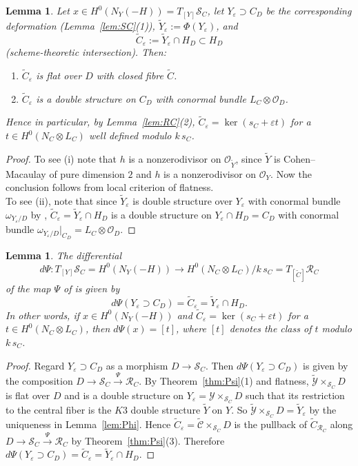 \documentclass[11pt,reqno]{amsart}
\theoremstyle{plain}
\newtheorem{lemma}[theorem]{Lemma}
\theoremstyle{definition}
\newcommand{\OO}{\mathcal{O}}
\newcommand{\Yt}{\widetilde{Y}}
\newcommand{\Ct}{\widetilde{C}}
\newcommand{\NY}{N_{Y}}
\newcommand{\SC}{\mathcal{S}_C}
\newcommand{\RC}{\mathcal{R}_C}
\newcommand{\Dd}{D}
\newcommand{\cY}{\mathcal{Y}}
\newcommand{\cYt}{\widetilde{\mathcal{Y}}}
\newcommand{\cCt}{\widetilde{\mathcal{C}}}
\begin{document}
\begin{lemma}\label{def:Psi}
Let $x\in H^0(\NY(-H))=T_{[Y]}\SC$, let $Y_\varepsilon\supset C_\Dd$ be the corresponding deformation (Lemma~\ref{lem:SC}(1)), $\Yt_\varepsilon:=\Phi(Y_\varepsilon)$, and
\[
\Ct_\varepsilon:=\Yt_\varepsilon\cap H_\Dd\subset H_\Dd
\]
(scheme-theoretic intersection). Then:
\begin{enumerate}
\item[(i)] $\Ct_\varepsilon$ is flat over $\Dd$ with closed fibre $\Ct$. 
\item[(ii)] $\Ct_\varepsilon$ is a double structure on $C_\Dd$ with conormal bundle $L_C\otimes\OO_\Dd$. 
\end{enumerate}
Hence in particular, by Lemma~\ref{lem:RC}(2), $\Ct_\varepsilon=\ker(s_C+\varepsilon t)$ for a $t\in H^0(N_C\otimes L_C)$ well defined modulo $k\,s_C$.
\end{lemma}

\begin{proof}
To see (i) note that $h$ is a nonzerodivisor on $\OO_{\Yt}$, since $\Yt$ is Cohen--Macaulay of pure dimension $2$ and $h$ is a nonzerodivisor on $\OO_{Y}$. Now the conclusion follows from local criterion of flatness. \\
To see (ii), note that since $\widetilde Y_{\varepsilon}$ is double structure over $Y_{\varepsilon}$ with conormal bundle $\omega_{Y_{\varepsilon}/D}$ by , $\widetilde C_{\varepsilon} = \widetilde Y_{\varepsilon} \cap H_D$ is a double structure on $Y_{\varepsilon} \cap H_D = C_D$ with conormal bundle $\omega_{Y_{\varepsilon}/D}|_{C_D} = L_C \otimes \mathcal O_D$. 
\end{proof}

\begin{lemma}\label{lem:dPsi}
The differential
\[
d\Psi\colon T_{[Y]}\SC=H^0(\NY(-H))\longrightarrow H^0(N_C\otimes L_C)/k\,s_C=T_{[\Ct]}\RC
\]
of the map $\Psi$ of  is given by
\[
d\Psi(Y_\varepsilon\supset C_\Dd)=\Ct_\varepsilon=\Yt_\varepsilon\cap H_\Dd .
\]
In other words, if $x\in H^0(\NY(-H))$ and $\Ct_\varepsilon=\ker(s_C+\varepsilon t)$ for a $t\in H^0(N_C\otimes L_C)$, then $d\Psi(x)=[t]$, where $[t]$ denotes the class of $t$ modulo $k\,s_C$.
\end{lemma}

\begin{proof}
 Regard $Y_\varepsilon \supset C_D$ as a morphism $\Dd\to\SC$. Then $d\Psi(Y_\varepsilon \supset C_D)$ is given by the composition $D \to \mathcal{S}_C \xrightarrow{\Psi} \mathcal{R}_C$. By Theorem~\ref{thm:Psi}(1) and flatness, $\cYt\times_{\SC}\Dd$ is flat over $\Dd$ and is a double structure on $Y_\varepsilon=\cY\times_{\SC}\Dd$ such that its restriction to the central fiber is the $K3$ double structure $\widetilde Y $ on $Y$. So
 $\cYt\times_{\SC}\Dd=\Yt_\varepsilon$ by the uniqueness in Lemma~\ref{lem:Phi}. Hence $\Ct_\varepsilon=\cCt\times_{\SC}\Dd$ is the pullback of $\Ct_{\RC}$ along $D \to \mathcal{S}_C \xrightarrow{\Psi} \mathcal{R}_C$ by Theorem~\ref{thm:Psi}(3). Therefore $d\Psi(Y_\varepsilon\supset C_\Dd)=\Ct_\varepsilon=\Yt_\varepsilon\cap H_\Dd$. 
\end{proof}
\end{document}

